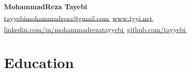 \documentclass[11pt,a4paper]{article}
\let\orighref\href
\renewcommand{\href}[2]{\orighref{#1}{#2\,{\textsuperscript{\tiny{\textcolor{heritagered}{\faExternalLink}}}}}}
\begin{document}
\graphicspath{ {./img} }


    \textbf{\textcolor{ultramarine}{\Large MohammadReza Tayebi}}
    \\
    \small\href{mailto:tayyebimohammadreza@gmail.com}{tayyebimohammadreza@gmail.com}
    \small\href{https://tyyi.net}{www.tyyi.net}
    \\
    \small\href{https://www.linkedin.com/in/mohammadrezatayyebi/}{linkedin.com/in/mohammadrezatayyebi}
    \small\href{https://github.com/tayyebi}{github.com/tayyebi}
    \vspace{-20pt}




\section{Education}
\end{document}
